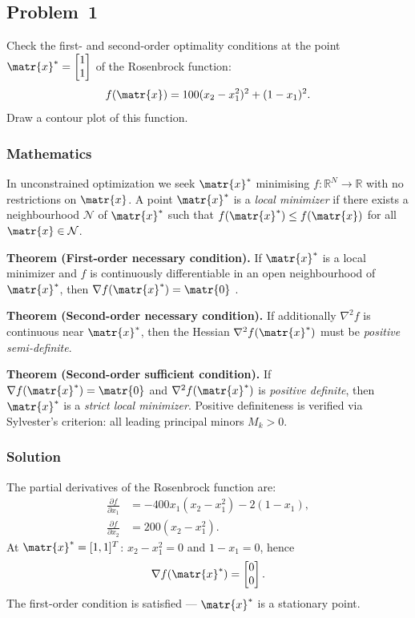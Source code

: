 \subsection{Problem~1}%
\label{problem:1}

Check the first- and second-order optimality conditions at the point
$\matr{x}^* = \begin{bmatrix} 1 \\ 1 \end{bmatrix}$
of the Rosenbrock function:
\begin{equation*}
  f(\matr{x}) = 100(x_2 - x_1^2)^2 + (1-x_1)^2.
\end{equation*}
Draw a contour plot of this function.

\subsubsection*{Mathematics}

In unconstrained optimization we seek $\matr{x}^*$ minimising $f : \mathbb{R}^N \to \mathbb{R}$
with no restrictions on $\matr{x}$.
A point $\matr{x}^*$ is a \textit{local minimizer} if there exists a neighbourhood
$\mathcal{N}$ of $\matr{x}^*$ such that $f(\matr{x}^*) \leq f(\matr{x})$ for all
$\matr{x} \in \mathcal{N}$.

\textbf{Theorem (First-order necessary condition).}
If $\matr{x}^*$ is a local minimizer and $f$ is continuously differentiable in an open
neighbourhood of $\matr{x}^*$, then $\nabla f(\matr{x}^*) = \matr{0}$ \citep{NoceWrig99}.

\textbf{Theorem (Second-order necessary condition).}
If additionally $\nabla^2 f$ is continuous near $\matr{x}^*$, then the Hessian
$\nabla^2 f(\matr{x}^*)$ must be \textit{positive semi-definite}.

\textbf{Theorem (Second-order sufficient condition).}
If $\nabla f(\matr{x}^*) = \matr{0}$ and $\nabla^2 f(\matr{x}^*)$ is
\textit{positive definite}, then $\matr{x}^*$ is a \textit{strict local minimizer}.
Positive definiteness is verified via Sylvester's criterion: all leading principal
minors $M_k > 0$.

\subsubsection*{Solution}

The partial derivatives of the Rosenbrock function are:
\begin{align*}
  \frac{\partial f}{\partial x_1} &= -400 x_1(x_2 - x_1^2) - 2(1-x_1), \\
  \frac{\partial f}{\partial x_2} &= 200(x_2 - x_1^2).
\end{align*}
At $\matr{x}^* = [1,1]^T$: $x_2 - x_1^2 = 0$ and $1 - x_1 = 0$, hence
\begin{equation*}
  \nabla f(\matr{x}^*) = \begin{bmatrix} 0 \\ 0 \end{bmatrix}.
\end{equation*}
The first-order condition is satisfied --- $\matr{x}^*$ is a stationary point.

